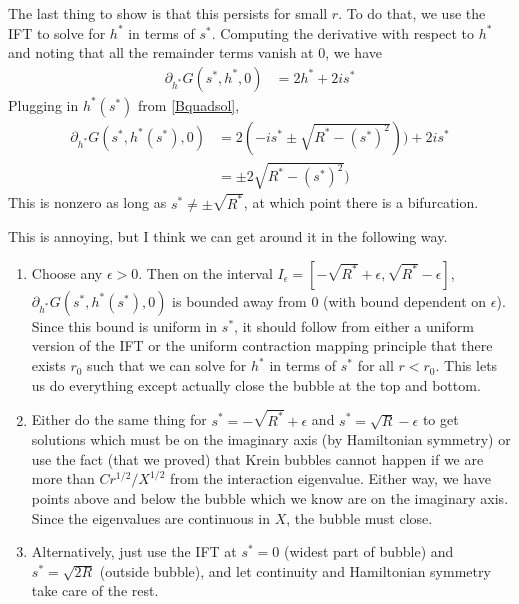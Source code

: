 \documentclass[thesis.tex]{subfiles}
\begin{document}
The last thing to show is that this persists for small $r$. To do that, we use the IFT to solve for $h^*$ in terms of $s^*$. Computing the derivative with respect to $h^*$ and noting that all the remainder terms vanish at 0, we have
\begin{align*}
\partial_{h^*} G(s^*, h^*, 0) 
&= 2 h^* + 2 i s^*
\end{align*}
Plugging in $h^*(s^*)$ from \cref{Bquadsol},
\begin{align*}
\partial_{h^*} G(s^*, h^*(s^*), 0) 
&= 2 (-i s^* \pm \sqrt{R^* - (s^*)^2 })) + 2 i s^* \\
&= \pm 2 \sqrt{R^* - (s^*)^2 })
\end{align*}
This is nonzero as long as $s^* \neq \pm \sqrt{R^*}$, at which point there is a bifurcation. 

This is annoying, but I think we can get around it in the following way.
\begin{enumerate}
\item Choose any $\epsilon > 0$. Then on the interval $I_\epsilon = [-\sqrt{R^*} + \epsilon, \sqrt{R^*} - \epsilon]$, $\partial_{h^*} G(s^*, h^*(s^*), 0)$ is bounded away from 0 (with bound dependent on $\epsilon$). Since this bound is uniform in $s^*$, it should follow from either a uniform version of the IFT or the uniform contraction mapping principle that there exists $r_0$ such that we can solve for $h^*$ in terms of $s^*$ for all $r < r_0$. This lets us do everything except actually close the bubble at the top and bottom.

\item Either do the same thing for $s^* = -\sqrt{R^*} + \epsilon$ and $s^* = \sqrt{R} - \epsilon$ to get solutions which must be on the imaginary axis (by Hamiltonian symmetry) or use the fact (that we proved) that Krein bubbles cannot happen if we are more than $C r^{1/2}/X^{1/2}$ from the interaction eigenvalue. Either way, we have points above and below the bubble which we know are on the imaginary axis. Since the eigenvalues are continuous in $X$, the bubble must close.

\item Alternatively, just use the IFT at $s^* = 0$ (widest part of bubble) and $s^* = \sqrt{2R}$ (outside bubble), and let continuity and Hamiltonian symmetry take care of the rest.

\end{enumerate} 
\end{document}
